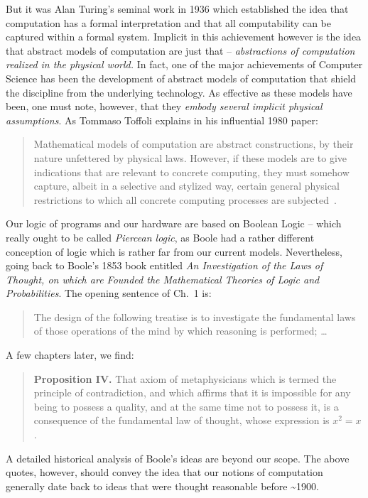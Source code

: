 \documentclass{article}
\begin{document}
But it was Alan Turing's seminal work in 1936 which established the idea
that computation has a formal interpretation and that all
computability can be captured within a formal system. Implicit in this
achievement however is the idea that abstract models of computation
are just that -- \emph{abstractions of computation realized in the
physical world.}  In fact, one of the major achievements of Computer
Science has been the development of abstract models of computation
that shield the discipline from the underlying technology. As
effective as these models have been, one must note, however, that they
\emph{embody several implicit physical assumptions}.  As Tommaso
Toffoli explains in his influential 1980 paper:

{\begin{quote} Mathematical models of computation are abstract
  constructions, by their nature unfettered by physical laws. However,
  if these models are to give indications that are relevant to
  concrete computing, they must somehow capture, albeit in a selective
  and stylized way, certain general physical restrictions to which all
  concrete computing processes are subjected~\cite{toffoli:1980}.
\end{quote}}

Our logic of programs and our hardware are based on Boolean Logic
-- which really
ought to be called \emph{Piercean logic}, as Boole had a rather different
conception of logic which is rather far from our current models.
Nevertheless, going back
to Boole's 1853 book entitled \emph{An Investigation of the Laws of Thought,
  on which are Founded the Mathematical Theories of Logic and
  Probabilities}. The opening sentence of Ch.~1 is:
\begin{quote}
  The design of the following treatise is to investigate the fundamental laws
  of those operations of the mind by which reasoning is performed; \ldots
\end{quote}
A few chapters later, we find:
\begin{quote}
  \textbf{Proposition IV.}  That axiom of metaphysicians which is termed the
  principle of contradiction, and which affirms that it is impossible for any
  being to possess a quality, and at the same time not to possess it, is a
  consequence of the fundamental law of thought, whose expression is $x^2 =
  x$.
\end{quote}
A detailed historical analysis of Boole's ideas are beyond our scope.
The above quotes, however, should convey the idea that our notions of
computation generally date back to ideas that were thought reasonable
before \textasciitilde 1900.
\end{document}
